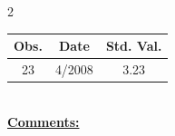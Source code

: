 
\bigskip 
\begin{multicols}{2}{ 
\begin{tabular}{ccc}
\hline  Obs.  &  Date &  Std. Val. \\ 
\hline 
                       23 &        4/2008 &          3.23 \vspace{-.12in} \\  
 \end{tabular} 
\\ 
 \columnbreak 
 \singlespacing 
 \underline{\textbf{Comments:}} \\ 
 \bigskip       

 } 
\end{multicols} 
